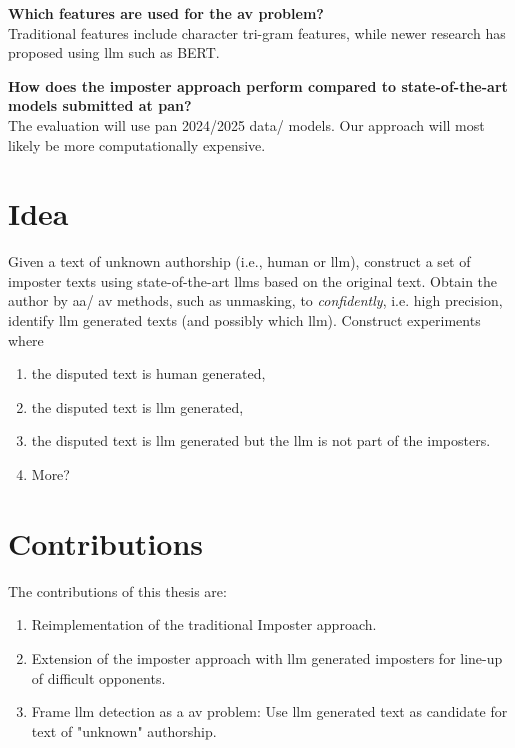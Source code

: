 \begin{questions}
    \item \textbf{Which features are used for the \ac{av} problem?} \label{enum:rq3} \hfill \\
    Traditional features include character tri-gram features, while newer research has proposed using \ac{llm} such as BERT.

    \item \textbf{How does the imposter approach perform compared to state-of-the-art models submitted at \ac{pan}?} \label{enum:rq4} \hfill \\
    The evaluation will use \ac{pan} 2024/2025 data/ models.
    Our approach will most likely be more computationally expensive.
\end{questions}

\section*{Idea}
\label{sec:idea}

Given a text of unknown authorship (i.e., human or \ac{llm}), 
construct a set of imposter texts using state-of-the-art \acp{llm} based on the original text.
Obtain the author by \ac{aa}/ \ac{av} methods, such as unmasking, to \textit{confidently}, i.e. high precision, identify \ac{llm} generated texts
(and possibly which \ac{llm}).
Construct experiments where
\begin{enumerate}
    \item the disputed text is human generated,
    \item the disputed text is \ac{llm} generated,
    \item the disputed text is \ac{llm} generated but the \ac{llm} is not part of the imposters.
    \item More?
\end{enumerate}


\section*{Contributions}
\label{sec:contributions}
The contributions of this thesis are:
\begin{enumerate}
    \item Reimplementation of the traditional Imposter approach.
    \item Extension of the imposter approach with \ac{llm} generated imposters for line-up of difficult opponents. 
    \item Frame \ac{llm} detection as a \ac{av} problem: Use \ac{llm} generated text as candidate for text of "unknown" authorship.
\end{enumerate}
